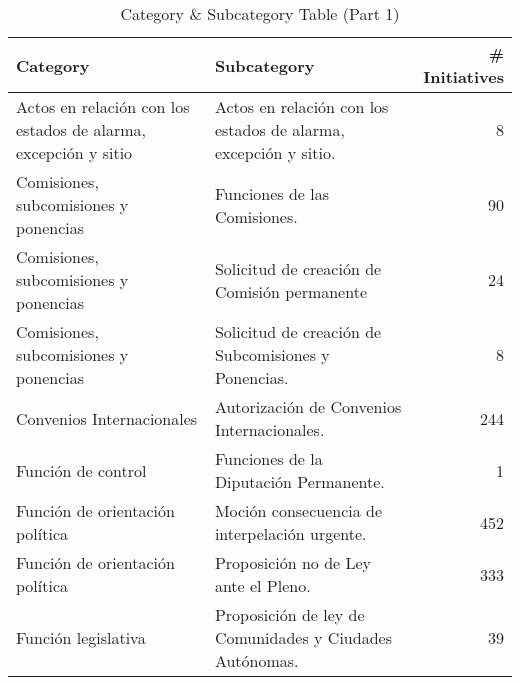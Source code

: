\begin{table}[H]
\centering
\renewcommand{\arraystretch}{1.3}
\begin{tabularx}{\textwidth}{l l r}
\toprule
\textbf{Category} & \textbf{Subcategory} & \textbf{\# Initiatives} \\
\midrule
Actos en relación con los estados de alarma, excepción y sitio & Actos en relación con los estados de alarma, excepción y sitio. & 8 \\
Comisiones, subcomisiones y ponencias & Funciones de las Comisiones. & 90 \\
Comisiones, subcomisiones y ponencias & Solicitud de creación de Comisión permanente & 24 \\
Comisiones, subcomisiones y ponencias & Solicitud de creación de Subcomisiones y Ponencias. & 8 \\
Convenios Internacionales & Autorización de Convenios Internacionales. & 244 \\
Función de control & Funciones de la Diputación Permanente. & 1 \\
Función de orientación política & Moción consecuencia de interpelación urgente. & 452 \\
Función de orientación política & Proposición no de Ley ante el Pleno. & 333 \\
Función legislativa & Proposición de ley de Comunidades y Ciudades Autónomas. & 39 \\
\bottomrule
\end{tabularx}
\caption{Category & Subcategory Table (Part 1)}
\label{tab:cat_subcat_1}
\end{table}


